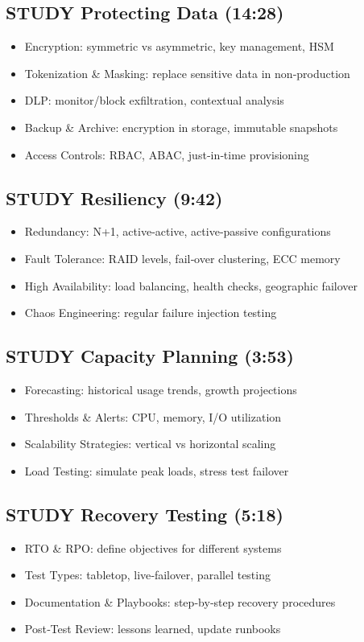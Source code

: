 \documentclass[11pt]{article}
\begin{document}
\subsection{{\bfseries\sffamily STUDY} Protecting Data (14:28)}
\label{sec:orgb93564d}
\begin{itemize}
\item Encryption: symmetric vs asymmetric, key management, HSM
\item Tokenization \& Masking: replace sensitive data in non‑production
\item DLP: monitor/block exfiltration, contextual analysis
\item Backup \& Archive: encryption in storage, immutable snapshots
\item Access Controls: RBAC, ABAC, just‑in‑time provisioning
\end{itemize}
\subsection{{\bfseries\sffamily STUDY} Resiliency (9:42)}
\label{sec:org82ab4cd}
\begin{itemize}
\item Redundancy: N+1, active‑active, active‑passive configurations
\item Fault Tolerance: RAID levels, fail‑over clustering, ECC memory
\item High Availability: load balancing, health checks, geographic failover
\item Chaos Engineering: regular failure injection testing
\end{itemize}
\subsection{{\bfseries\sffamily STUDY} Capacity Planning (3:53)}
\label{sec:org9129aa4}
\begin{itemize}
\item Forecasting: historical usage trends, growth projections
\item Thresholds \& Alerts: CPU, memory, I/O utilization
\item Scalability Strategies: vertical vs horizontal scaling
\item Load Testing: simulate peak loads, stress test failover
\end{itemize}
\subsection{{\bfseries\sffamily STUDY} Recovery Testing (5:18)}
\label{sec:org0595320}
\begin{itemize}
\item RTO \& RPO: define objectives for different systems
\item Test Types: tabletop, live‑failover, parallel testing
\item Documentation \& Playbooks: step‑by‑step recovery procedures
\item Post‑Test Review: lessons learned, update runbooks
\end{itemize}
\end{document}
